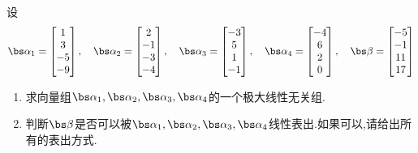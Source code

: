 \documentclass{ctexart}
\begin{document}
\begin{homework}[2(18')]
    设
    \[\bs\alpha_1=\begin{bmatrix}
        1\\3\\-5\\-9
    \end{bmatrix},\quad\bs\alpha_2=\begin{bmatrix}
        2\\-1\\-3\\-4
    \end{bmatrix},\quad\bs\alpha_3=\begin{bmatrix}
        -3\\5\\1\\-1
    \end{bmatrix},\quad\bs\alpha_4=\begin{bmatrix}
        -4\\6\\2\\0
    \end{bmatrix},\quad\bs\beta=\begin{bmatrix}
        -5\\-1\\11\\17
    \end{bmatrix}\]
    \begin{enumerate}[label=\tbf{(\arabic*)},topsep=0pt,parsep=0pt,itemsep=0pt,partopsep=0pt]
        \item 求向量组$\bs\alpha_1,\bs\alpha_2,\bs\alpha_3,\bs\alpha_4$的一个极大线性无关组.
        \item 判断$\bs\beta$是否可以被$\bs\alpha_1,\bs\alpha_2,\bs\alpha_3,\bs\alpha_4$线性表出.如果可以,请给出所有的表出方式.
    \end{enumerate}
\end{homework}
\end{document}
